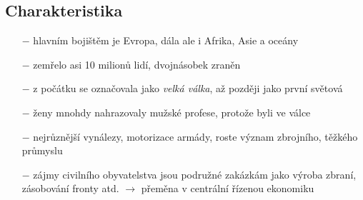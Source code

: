 \documentclass{article}
\begin{document}
\subsection*{Charakteristika}
\begin{itemize}
    \vspace{-0.5em}
    \setlength\itemsep{0.15em}
    \item[$-$] hlavním bojištěm je Evropa, dála ale i Afrika, Asie a oceány
    \item[$-$] zemřelo asi 10 milionů lidí, dvojnásobek zraněn
    \item[$-$] z počátku se označovala jako \textit{velká válka}, až později jako první světová
    \item[$-$] ženy mnohdy nahrazovaly mužské profese, protože byli ve válce
    \item[$-$] nejrůznější vynálezy, motorizace armády, roste význam zbrojního, těžkého průmyslu
    \item[$-$] zájmy civilního obyvatelstva jsou podružné zakázkám jako výroba zbraní, zásobování fronty atd. $\rightarrow$ přeměna v centrální řízenou ekonomiku
\end{itemize}
\end{document}
